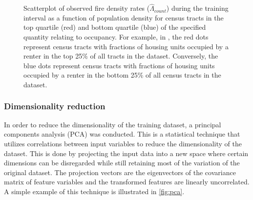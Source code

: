 \documentclass{svjour3}
\begin{document}
\begin{figure}[!ht]
\begin{center}
{          }
      \end{center}
      \caption{Scatterplot of observed fire density rates ($\hat\Lambda_{count}$) during the training interval as a function of population density for census tracts in the top quartile (red) and bottom quartile (blue) of the specified quantity relating to occupancy. For example, in \protect{}, the red dots represent census tracts with fractions of housing units occupied by a renter in the top 25\% of all tracts in the dataset. Conversely, the blue dots represent census tracts with fractions of housing units occupied by a renter in the bottom 25\% of all census tracts in the dataset.}
     \label{fig:occupancy}
  \end{figure}
 
 
 \clearpage
  \subsubsection{Dimensionality reduction}
    In order to reduce the dimensionality of the training dataset, a principal components analysis (PCA) was conducted. This is a statistical technique that utilizes correlations between input variables to reduce the dimensionality of the dataset. This is done by projecting the input data into a new space where certain dimensions can be disregarded while still retaining most of the variation of the original dataset. The projection vectors are the eigenvectors of the covariance matrix of feature variables and the transformed features are linearly uncorrelated. A simple example of this technique is illustrated in \ref{fig:pca}.
  
\end{document}
